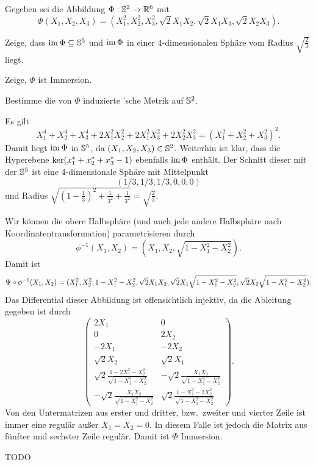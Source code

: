 \documentclass{article}
\begin{document}
\begin{exercise}
    Gegeben sei die Abbildung $\Phi:\mathbb{S}^2\rightarrow\mathbb{R}^6$ mit
    $$
    \Phi(X_1,X_2,X_3)=(X_1^2,X_2^2,X_3^2,\sqrt 2X_1X_2,\sqrt 2X_1X_3,\sqrt 2X_2X_3).
    $$
    \begin{tasks}
            \item Zeige, dass $\mathop\mathrm{im}\Phi\subseteq \mathbb{S}^5$ und $\mathop\mathrm{im}\Phi$ in einer $4$-dimensionalen Sphäre vom Radius $\sqrt{\frac 2 3}$ liegt.
            \item Zeige, $\Phi$ ist Immersion.
            \item Bestimme die von $\Phi$ induzierte 'sche Metrik auf $\mathbb{S}^2$.
    \end{tasks}
\end{exercise}

\begin{solution}
    \begin{tasks}
            \item Es gilt
        $$
        X_1^4+X_2^4+X_3^4+2 X_1^2X_2^2+2 X_1^2X_3^2+2X_2^2X_3^2={(X_1^2+X_2^2+X_3^2)}^2.
        $$
        Damit liegt $\mathop\mathrm{im}\Phi$ in $\mathbb{S}^5$, da $(X_1,X_2,X_3)\in\mathbb{S}^2$.
        Weiterhin ist klar, dass die Hyperebene $\ker ({x}^{\ast}_1+{x}^{\ast}_2+{x}^{\ast}_3 -1)$ ebenfalls $\mathop\mathrm{im}\Phi$ enthält. Der Schnitt dieser mit der $\mathbb{S}^5$ ist eine $4$-dimensionale Sphäre mit Mittelpunkt
        $$(1/3,1/3,1/3, 0, 0, 0)$$
        und Radius $\sqrt{{(1-\frac 1 3)}^2+\frac 1 {3^2}+\frac 1 {3^2}}=\sqrt{\frac 2 3}$.
            \item Wir können die obere Halbsphäre (und auch jede andere Halbsphäre nach Koordinatentransformation) parametrisieren durch
        $$
        \phi^{-1}(X_1,X_2)=(X_1,X_2,\sqrt{1-X_1^2-X_2^2}).
        $$
        Damit ist
        $$
        \Psi\circ\phi^{-1}(X_1,X_2)=(X_1^2,X_2^2,1-X_1^2-X_2^2,\sqrt 2X_1 X_2,\sqrt 2X_1\sqrt{1-X_1^2-X_2^2},\sqrt 2 X_2\sqrt{1-X_1^2-X_2^2}).
        $$
        Das Differential dieser  Abbildung ist offensichtlich injektiv, da die Ableitung gegeben ist durch
        $$
        \begin{pmatrix}
            2X_1 & 0\\
            0 & 2X_2\\
            -2X_1 & -2X_2\\
            \sqrt 2X_2 & \sqrt 2X_1\\
            \sqrt 2 \frac{1-2X_1^2-X_2^2}{\sqrt{1-X_1^2-X_2^2}} &-\sqrt 2\frac{X_1X_2}{\sqrt{1-X_1^2-X_2^2}}\\
            -\sqrt 2\frac{X_1X_2}{\sqrt{1-X_1^2-X_2^2}} & \sqrt 2 \frac{1-X_1^2-2X_2^2}{\sqrt{1-X_1^2-X_2^2}}
        \end{pmatrix}.
        $$
        Von den Untermatrizen aus erster und dritter, bzw.\ zweiter und vierter Zeile ist immer eine regulär außer $X_1=X_2=0$.
        In diesem Falle ist jedoch die Matrix aus fünfter und sechster Zeile regulär. Damit ist $\Phi$ Immersion.
        \item TODO
    \end{tasks}
\end{solution}
\end{document}
